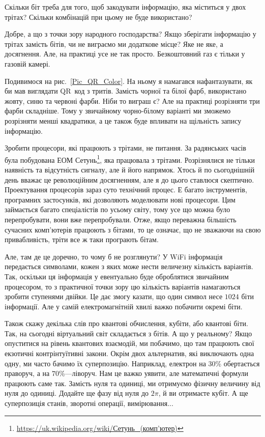 \documentclass{book}
\newcommand{\setunref}{\href{https://uk.wikipedia.org/wiki/\%D0\%A1\%D0\%B5\%D1\%82\%D1\%83\%D0\%BD\%D1\%8C_(\%D0\%BA\%D0\%BE\%D0\%BC\%D0\%BF\%27\%D1\%8E\%D1\%82\%D0\%B5\%D1\%80)}{https://uk.wikipedia.org/wiki/Сетунь\_(комп'ютер)}}
\begin{document}
\begin{exercise}
Скільки біт треба для того, щоб закодувати інформацію, яка міститься у двох трітах?
Скільки комбінацій при цьому не буде використано?
\end{exercise}

Добре, а що з точки зору народного господарства?
Якщо зберігати інформацію у трітах замість бітів, чи не виграємо ми додаткове місце?
Яке не яке, а досягнення.
Але, на практиці усе не так просто.
Безкоштовний газ є тільки у газовій камері.

Подивимося на рис.~\ref{Pic_QR_Color}.
На ньому я намагався нафантазувати, як би мав виглядати QR~код з тритів.
Замість чорної та білої фарб, використано жовту, синю та червоні фарби.
Ніби то виграш є?
Але на практиці розрізняти три фарби складніше.
Тому у звичайному чорно-білому варіанті ми зможемо розрізняти менші квадратики, а це також буде впливати на щільність запису інформацію.

Зробити процесори, які працюють з трітами, не питання.
За радянських часів була побудована ЕОМ Сетунь\footnote{\setunref}, яка працювала з трітами. 
Розрізнялися не тільки наявність та відсутність сигналу, але й його напрямок.
Хтось й по сьогоднішній день вважає це революційним досягненням, але я до цього ставлюся скептично.
Проектування процесорів зараз суто технічний процес.
Е багато інструментів, програмних застосунків, які дозволяють моделювати нові процесори.
Цим займається багато спеціалістів по усьому світу, тому усе що можна було перепробувати, вони вже перепробували.
Отже, якщо переважна більшість сучасних комп'ютерів працюють з бітами, то це означає, що не зважаючи на свою привабливість, тріти все ж таки програють бітам.

Але, там де це доречно, то чому б не розглянути?
У WiFi інформація передається символами, кожен з яких може нести величезну кількість варіантів.
Так, оскільки ця інформація у евентуально буде оброблятися звичайним процесором, то з практичної точки зору цю кількість варіантів намагаються зробити ступенями двійки.
Це дає змогу казати, що один символ несе $1024$ біти інформації.
Але у самій електромагнітній хвилі важко побачити окремі біти.

Також скажу декілька слів про квантові обчислення, кубіти, або квантові біти. 
Так, на сьогодні віртуальний світ складається з бітів. А що у реальному?
Якщо опуститися на рівень квантових взаємодій, ми побачимо, що там працюють свої екзотичні контрінтуїтивні закони.
Окрім двох альтернатив, які виключають одна одну, ми часто бачимо їх суперпозицію.
Наприклад, електрон на $30$\% обертається праворуч, а на $70$\%---ліворуч.
Нам це важко уявити, але математичні формули працюють саме так.
Замість нуля та одиниці, ми отримуємо фізичну величину від нуля до одиниці.
Додайте ще фазу від нуля до $2\pi$, й ви отримаєте кубіт.
А ще суперпозиція станів, зворотні операції, вимірювання...
\end{document}
